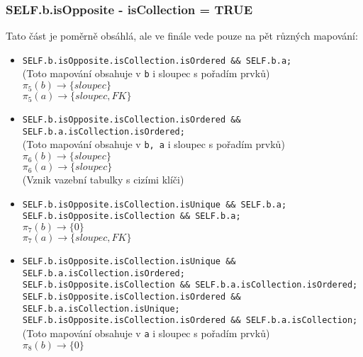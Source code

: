 \documentclass[11pt,a4paper]{article}
\begin{document}
   		\subsubsection{SELF.b.isOpposite - isCollection = TRUE}
   		Tato část je poměrně obsáhlá, ale ve finále vede pouze na pět různých mapování:
   				\begin{itemize}				    
         			\item \texttt	{SELF.b.isOpposite.isCollection.isOrdered \&\& SELF.b.a; \\}
         							(Toto mapování obsahuje v \texttt {b} i sloupec s pořadím prvků) \\        							
         							$\pi_5(b) \to \{ sloupec\}$ \\
         							$\pi_5(a) \to \{ sloupec, FK\}$		
         			\item \texttt	{SELF.b.isOpposite.isCollection.isOrdered \&\& SELF.b.a.isCollection.isOrdered; \\}
         							(Toto mapování obsahuje v \texttt {b, a} i sloupec s pořadím prvků) \\        							
         							$\pi_6(b) \to \{ sloupec\}$ \\
         							$\pi_6(a) \to \{ sloupec\}$	\\	
         							(Vznik vazební tabulky s cizími klíči)
         			\item \texttt	{SELF.b.isOpposite.isCollection.isUnique \&\& SELF.b.a; \\
         							 SELF.b.isOpposite.isCollection \&\& SELF.b.a; \\}    							
         							$\pi_7(b) \to \{ 0\}$ \\
         							$\pi_7(a) \to \{ sloupec, FK\}$	\\
         			\item \texttt	{SELF.b.isOpposite.isCollection.isUnique \&\& SELF.b.a.isCollection.isOrdered; \\
         							 SELF.b.isOpposite.isCollection \&\& SELF.b.a.isCollection.isOrdered; \\
         							 SELF.b.isOpposite.isCollection.isOrdered \&\& SELF.b.a.isCollection.isUnique; \\
         							 SELF.b.isOpposite.isCollection.isOrdered \&\& SELF.b.a.isCollection; \\}
         							(Toto mapování obsahuje v \texttt {a} i sloupec s pořadím prvků) \\        							
         							$\pi_8(b) \to \{ 0\}$ \\

\end{itemize}
\end{document}
